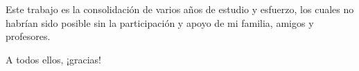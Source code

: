 \begin{acknowledgements}
Este trabajo es la consolidación de varios años de estudio y esfuerzo, los cuales no habrían sido
posible sin la participación y apoyo de mi familia, amigos y profesores.  

\begin{flushright}
A todos ellos, ¡gracias!
\end{flushright}
\end{acknowledgements}